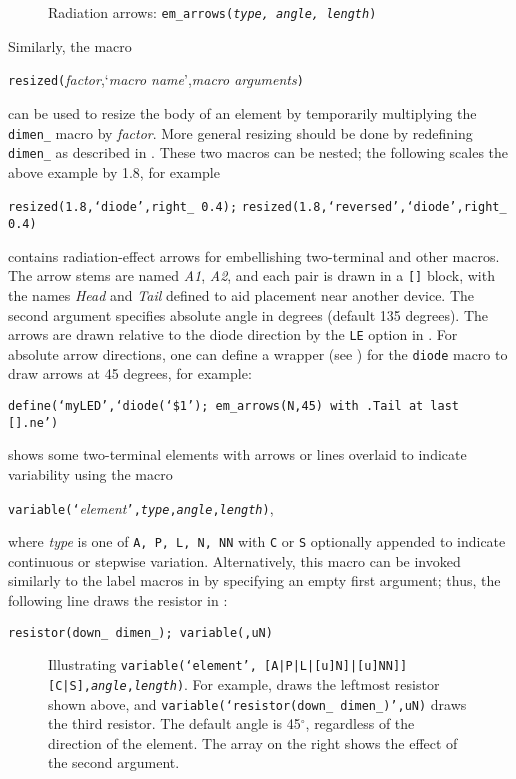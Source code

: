 \begin{figure}[bt]
   
   \caption{Radiation arrows: {\tt em\_arrows({\sl type, angle, length})}}
   \label{Emarrows}
   \end{figure}
Similarly, the macro
\par
{\tt resized(}{\sl factor},`{\sl macro name}',{\sl macro arguments}{\tt )}
\par
\noindent
can be used to resize the body of an element by temporarily multiplying
the {\tt dimen\_} macro by {\sl factor}. More general resizing should be
done by redefining {\tt dimen\_} as described in .
These two macros can be nested; the following scales the above example
by 1.8, for example
\par
{\tt resized(1.8,`diode',right\_ 0.4);}
{\tt resized(1.8,`reversed',`diode',right\_ 0.4)}

 contains radiation-effect arrows for embellishing two-terminal
and other macros.
The arrow stems are named {\sl A1}, {\sl A2},
and each pair is drawn in a \verb|[]| block, with
the names {\sl Head} and {\sl Tail} defined to
aid placement near another device.  The second argument specifies
absolute angle in degrees (default 135 degrees).
The arrows are drawn relative to the diode direction by the {\tt LE}
option in .  For absolute arrow directions, one can
define a wrapper (see ) for the {\tt diode} macro to draw arrows
at 45 degrees, for example:
\par
{\tt define(`myLED',`diode(`\$1'); em\_arrows(N,45)
 with .Tail at last [].ne')}

 shows some two-terminal elements with
arrows or lines overlaid to indicate variability using the macro
\par
{\tt variable(`}{\sl element}{\tt',{\sl type},{\sl angle},{\sl length})},

\noindent
where {\sl type} is one of {\tt A, P, L, N, NN} with {\tt C} or {\tt S}
optionally appended to indicate continuous or stepwise variation.
Alternatively, this macro
can be invoked similarly to the label macros in
 by specifying an empty first argument;
thus, the following line draws the resistor in :
\par
   {\tt resistor(down\_ dimen\_); variable(,uN)}

\begin{figure}[h!t]
\vspace*{-\baselineskip}
   
   \caption{Illustrating
{\tt variable(`{\sl element}',%
[A|P|L|[u]N]|[u]NN]][C|S],{\sl angle},{\sl length})}.
   For example, draws
   the leftmost resistor shown above, and {\tt variable(`resistor(down\_
   dimen\_)',uN)} draws the third resistor.  The default angle is
   45${}^{\circ}$, regardless of the direction of the element.  The array
   on the right shows the effect of the second argument.}
   \label{Variable}
   \end{figure}

